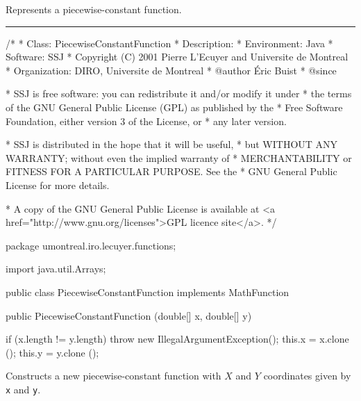 

Represents a piecewise-constant function.

\bigskip\hrule

\begin{code}
\begin{hide}
/*
 * Class:        PiecewiseConstantFunction
 * Description:  
 * Environment:  Java
 * Software:     SSJ 
 * Copyright (C) 2001  Pierre L'Ecuyer and Universite de Montreal
 * Organization: DIRO, Universite de Montreal
 * @author       Éric Buist
 * @since

 * SSJ is free software: you can redistribute it and/or modify it under
 * the terms of the GNU General Public License (GPL) as published by the
 * Free Software Foundation, either version 3 of the License, or
 * any later version.

 * SSJ is distributed in the hope that it will be useful,
 * but WITHOUT ANY WARRANTY; without even the implied warranty of
 * MERCHANTABILITY or FITNESS FOR A PARTICULAR PURPOSE.  See the
 * GNU General Public License for more details.

 * A copy of the GNU General Public License is available at
   <a href="http://www.gnu.org/licenses">GPL licence site</a>.
 */
\end{hide}
package umontreal.iro.lecuyer.functions;\begin{hide}

import java.util.Arrays;
\end{hide}

public class PiecewiseConstantFunction implements MathFunction\begin{hide} {
   private double[] x;
   private double[] y;
\end{hide}

   public PiecewiseConstantFunction (double[] x, double[] y)\begin{hide} {
      if (x.length != y.length)
         throw new IllegalArgumentException();
      this.x = x.clone ();
      this.y = y.clone ();
   }\end{hide}
\end{code}
\begin{tabb}   Constructs a new piecewise-constant function
 with $X$ and $Y$ coordinates given
 by \texttt{x} and \texttt{y}.
\end{tabb}
\begin{htmlonly}
\end{htmlonly}
